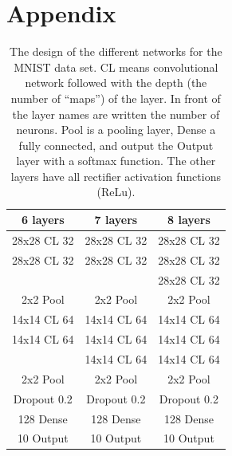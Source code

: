 \documentclass[%
 reprint,
 amsmath,amssymb,
 aps,
]{revtex4-1}
\begin{document}
\clearpage	

\section*{Appendix}

\begin{table}[h]
\begin{tabular}{c | c | c}
6 layers & 7 layers & 8 layers  \\ \hline\hline
28x28 CL 32 & 28x28 CL 32 & 28x28 CL 32 \\
28x28 CL 32 & 28x28 CL 32 & 28x28 CL 32 \\
 &   & 28x28 CL 32 \\
2x2 Pool & 2x2 Pool & 2x2 Pool \\
14x14 CL 64 & 14x14 CL 64 & 14x14 CL 64\\
14x14 CL 64 & 14x14 CL 64 & 14x14 CL 64\\
 & 14x14 CL 64 & 14x14 CL 64\\
2x2 Pool & 2x2 Pool  & 2x2 Pool \\
Dropout 0.2 & Dropout 0.2 & Dropout 0.2\\
128 Dense & 128  Dense& 128 Dense\\
10 Output & 10 Output & 10 Output
\end{tabular}
\caption{The design of the different networks for the MNIST data set. CL means convolutional network followed with the depth (the number of ``maps'') of the layer.  In front of the layer names are written the number of neurons. Pool is a pooling layer, Dense a fully connected, and output the Output layer with a softmax function. The other layers have all rectifier activation functions (ReLu).}
\label{tab:mnist_netw}
\end{table}
\end{document}
